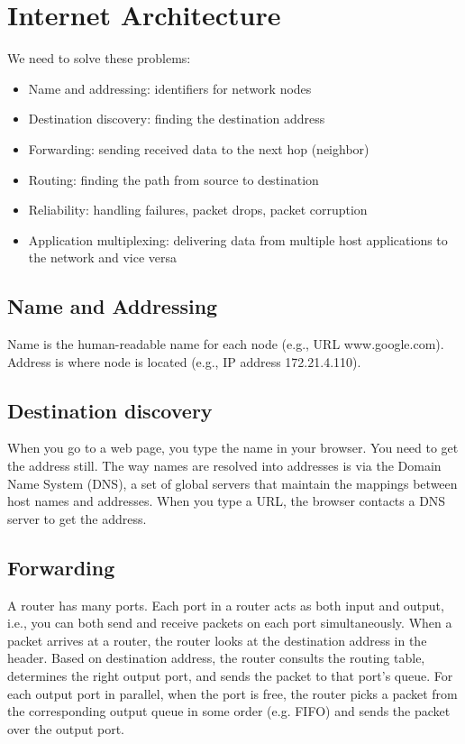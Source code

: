 \section{Internet Architecture}

We need to solve these problems:
\begin{itemize}
    \item Name and addressing: identifiers for network nodes
    \item Destination discovery: finding the destination address
    \item Forwarding: sending received data to the next hop (neighbor)
    \item Routing: finding the path from source to destination
    \item Reliability: handling failures, packet drops, packet corruption
    \item Application multiplexing: delivering data from multiple host
          applications to the network and vice versa
\end{itemize}

\subsection{Name and Addressing}
Name is the human-readable name for each node (e.g., URL www.google.com).
Address is where node is located (e.g., IP address 172.21.4.110).

\subsection{Destination discovery}
When you go to a web page, you type the name in your browser. You
need to get the address still. The way names are resolved into
addresses is via the Domain Name System (DNS), a set of global
servers that maintain the mappings between host names and addresses.
When you type a URL, the browser contacts a DNS server to get the address.

\subsection{Forwarding}
A router has many ports. Each port in a router acts as both input
and output, i.e., you can both send and receive packets on each port
simultaneously.
When a packet arrives at a router, the router looks at the destination address
in the header. Based on destination address, the router consults the routing
table, determines the right output port, and sends the packet to that port's queue.
For each output port in parallel, when the port is free, the router picks
a packet from the corresponding output queue in some order (e.g. FIFO) and
sends the packet over the output port.

